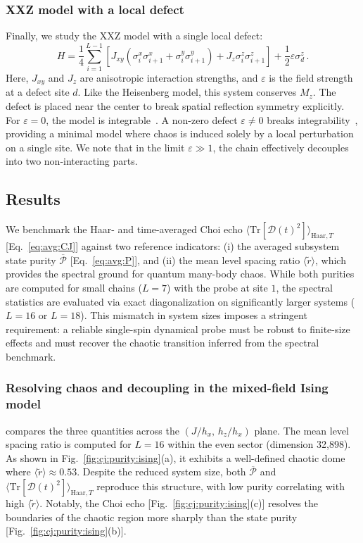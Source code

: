\documentclass[pra,twocolumn,aps,showpacs,superscriptaddress,longbibliography]{revtex4-2}%
\newcommand{\choip}{\langle \text{Tr}[\mathcal{D}(t)^2] \rangle_{\mathrm{Haar}, T}}
\newcommand{\statep}{\overline{\mathcal{P}}}
\begin{document}
\subsubsection{XXZ model with a local defect}\label{sec:xxz}
Finally, we study the XXZ model with a single local defect:
\begin{equation}\label{eq:H:xxz}
H = \frac{1}{4}\sum_{i=1}^{L-1} \left[ J_{xy} (\sigma_i^x\sigma_{i+1}^x + \sigma_i^y\sigma_{i+1}^y) + J_z \sigma_i^z\sigma_{i+1}^z \right] + \frac{1}{2}\varepsilon \sigma_d^z \, .
\end{equation}
Here, $J_{xy}$ and $J_z$ are anisotropic interaction strengths, and $\varepsilon$ is the field strength at a defect site $d$. Like the Heisenberg model, this system conserves $M_z$. The defect is placed near the center to break spatial reflection symmetry explicitly. For $\varepsilon = 0$, the model is integrable~\cite{bethe_1931_zur}. A non-zero defect $\varepsilon \neq 0$ breaks integrability~\cite{santos_2004_integrability,brenes_2018_hightemperature,pandey_2020_adiabatic}, providing a minimal model where chaos is induced solely by a local perturbation on a single site. We note that in the limit $\varepsilon \gg 1$, the chain effectively decouples into two non-interacting parts.


\subsection{Results}\label{sec:results_discussion}
We benchmark the Haar- and time-averaged Choi echo $\choip$ [Eq.~\eqref{eq:avg:CJ}] against two reference indicators:  
(i) the averaged subsystem state purity $\statep$ [Eq.~\eqref{eq:avg:P}], and  
(ii) the mean level spacing ratio $\langle \tilde{r} \rangle$, which provides the spectral ground for quantum many-body chaos. While both purities are computed for small chains ($L=7$) with the probe at site $1$, the spectral statistics are evaluated via exact diagonalization on significantly larger systems ($L=16$ or $L=18$). This mismatch in system sizes imposes a stringent requirement: a reliable single-spin dynamical probe must be robust to finite-size effects and must recover the chaotic transition inferred from the spectral benchmark.

\subsubsection{Resolving chaos and decoupling in the mixed-field Ising model}
 compares the three quantities across the $(J/h_x,\,h_z/h_x)$ plane. The mean level spacing ratio is computed for $L=16$ within the even sector (dimension 32,898). As shown in Fig.~\ref{fig:cj:purity:ising}(a), it exhibits a well-defined chaotic dome where $\langle \tilde{r} \rangle \approx 0.53$. Despite the reduced system size, both $\statep$ and $\choip$ reproduce this structure, with low purity correlating with high $\langle \tilde{r} \rangle$. Notably, the Choi echo [Fig.~\ref{fig:cj:purity:ising}(c)] resolves the boundaries of the chaotic region more sharply than the state purity [Fig.~\ref{fig:cj:purity:ising}(b)].
\end{document}
